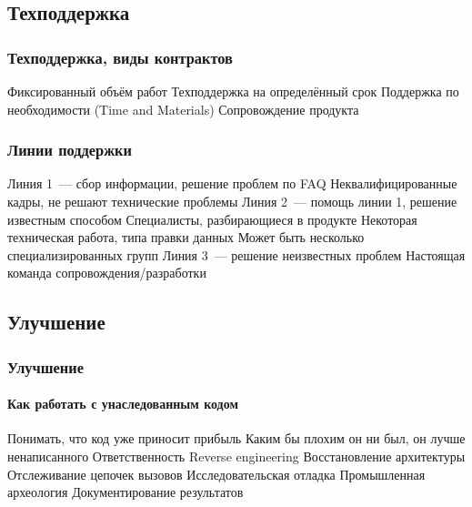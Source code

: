 \documentclass{../../slides-style}
\begin{document}
    \subsection{Техподдержка}

    \begin{frame}
        \frametitle{Техподдержка, виды контрактов}
        \begin{outline}
            \1 Фиксированный объём работ
            \1 Техподдержка на определённый срок
            \1 Поддержка по необходимости (Time and Materials)
            \1 Сопровождение продукта
        \end{outline}
    \end{frame}

    \begin{frame}
        \frametitle{Линии поддержки}
        \begin{outline}
            \1 Линия 1~--- сбор информации, решение проблем по FAQ
                \2 Неквалифицированные кадры, не решают технические проблемы
            \1 Линия 2~--- помощь линии 1, решение известным способом
                \2 Специалисты, разбирающиеся в продукте
                \2 Некоторая техническая работа, типа правки данных
                \2 Может быть несколько специализированных групп
            \1 Линия 3~--- решение неизвестных проблем
                \2 Настоящая команда сопровождения/разработки
        \end{outline}
    \end{frame}

    \subsection{Улучшение}

    \begin{frame}
        \frametitle{Улучшение}
        \framesubtitle{Как работать с унаследованным кодом}
        \begin{outline}
            \1 Понимать, что код уже приносит прибыль
                \2 Каким бы плохим он ни был, он лучше ненаписанного
                \2 Ответственность
            \1 Reverse engineering
                \2 Восстановление архитектуры
                \2 Отслеживание цепочек вызовов
                \2 Исследовательская отладка
                \2 Промышленная археология
                \2 Документирование результатов
        \end{outline}
    \end{frame}
\end{document}
